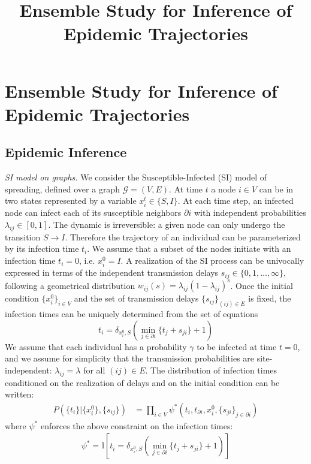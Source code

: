 \documentclass[a4paper, amsfonts, amssymb, amsmath, reprint, showkeys, nofootinbib, twoside, floatfix, pre,superscriptaddress]{revtex4-2}
\begin{document}
\title{Ensemble Study for Inference of Epidemic Trajectories}

\maketitle

\section{Ensemble Study for Inference of Epidemic Trajectories}
\subsection{Epidemic Inference}
{\it SI model on graphs.}
We consider the Susceptible-Infected (SI) model of spreading, defined over a graph $\mathcal{G}=(V,E)$.
At time $t$ a node $i\in V$ can be in two states represented by a variable $x_i^t\in\{S,I\}$.
At each time step, an infected node can infect each of its susceptible neighbors $\partial i$ with independent probabilities $\lambda_{ij}\in[0,1]$.
The dynamic is irreversible: a given node can only undergo the transition $S\to I$. 
Therefore the trajectory of an individual can be parameterized by its infection time $t_i$.
We assume that a subset of the nodes initiate with an infection time $t_i=0$, i.e. $x_i^0=I$.
A realization of the SI process can be univocally expressed in terms of the independent transmission delays $s_{ij}\in\{0, 1, \dots, \infty\}$, following a geometrical distribution $w_{ij}(s)=\lambda_{ij}(1-\lambda_{ij})^s$.
Once the initial condition $\{x_i^0\}_{i\in V}$ and the set of transmission delays $\{s_{ij}\}_{(ij)\in E}$ is fixed, the infection times can be uniquely determined from the set of equations
$$
	t_i=\delta_{x_i^0,S}(\min_{j\in\partial i}\{t_j+s_{ji}\}+1)
$$
We assume that each individual has a probability $\gamma$ to be infected at time $t=0$, and we assume for simplicity that the transmission probabilities are site-independent: $\lambda_{ij}=\lambda$ for all $(ij)\in E$.
The distribution of infection times conditioned on the realization of delays and on the initial condition can be written:
\begin{align*}
	P(\{t_i\}|\{x_i^0\},\{s_{ij}\})&=\prod_{i\in V}	\psi^*(t_i, t_{\partial i}, x_i^0, \{s_{ji}\}_{j\in\partial i}) 
\end{align*}
where $\psi^*$ enforces the above constraint on the infection times:
\begin{align}
	\label{eq:constraint_infection_times}
	\psi^*=\mathbb{I}[t_i=\delta_{x_i^0,S}(\min_{j\in\partial i}\{t_j+s_{ji}\}+1)]
\end{align}
\end{document}

